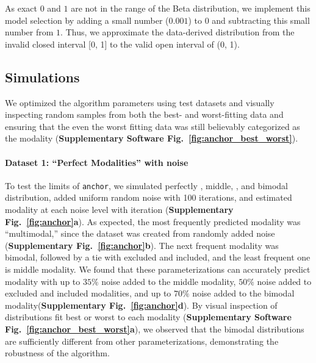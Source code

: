 As exact $0$ and $1$ are not in the range of the Beta distribution, we implement this model selection by adding a small number ($0.001$) to $0$ and subtracting this small number from $1$. Thus, we approximate the data-derived distribution from the invalid closed interval [0, 1] to the valid open interval of (0, 1).


\subsection{Simulations}

We optimized the algorithm parameters using test datasets and visually inspecting random samples from both the best- and worst-fitting data and ensuring that the even the worst fitting data was still believably categorized as the modality (\textbf{Supplementary Software Fig.~\ref{fig:anchor_best_worst}}).

\paragraph{Dataset 1: ``Perfect Modalities'' with noise}
\label{sec:anchor_perfect_modalities}

To test the limits of \texttt{anchor}, we simulated perfectly \0, middle, \1, and bimodal distribution, added uniform random noise with 100 iterations, and estimated modality at each noise level with iteration (\textbf{Supplementary Fig.~\ref{fig:anchor}a}). As expected, the most frequently predicted modality was ``multimodal,'' since the dataset was created from randomly added noise (\textbf{Supplementary Fig.~\ref{fig:anchor}b}). The next frequent modality was bimodal, followed by a tie with excluded and included, and the least frequent one is middle modality. We found that these parameterizations can accurately predict modality with up to $35\%$ noise added to the middle modality, $50\%$ noise added to excluded and included modalities, and up to $70\%$ noise added to the bimodal modality(\textbf{Supplementary Fig.~\ref{fig:anchor}d}). By visual inspection of distributions fit best or worst to each modality (\textbf{Supplementary Software Fig.~\ref{fig:anchor_best_worst}a}), we observed that the bimodal distributions are sufficiently different from other parameterizations, demonstrating the robustness of the algorithm.

